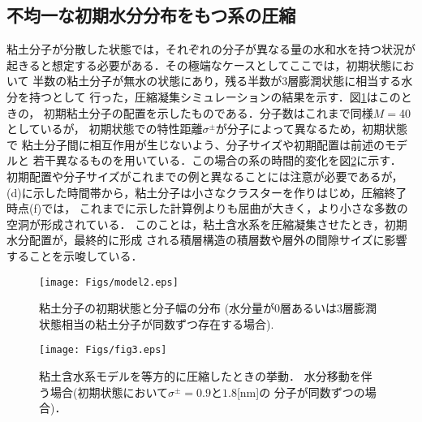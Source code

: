 ﻿\documentclass[11pt,a4j]{jarticle}
\begin{document}
\subsection{不均一な初期水分分布をもつ系の圧縮}
粘土分子が分散した状態では，それぞれの分子が異なる量の水和水を持つ状況が
起きると想定する必要がある．その極端なケースとしてここでは，初期状態において
半数の粘土分子が無水の状態にあり，残る半数が3層膨潤状態に相当する水分を持つとして
行った，圧縮凝集シミュレーションの結果を示す．図\ref{fig:fig8}はこのときの，
初期粘土分子の配置を示したものである．分子数はこれまで同様$M=$40としているが，
初期状態での特性距離$\sigma^\pm$が分子によって異なるため，初期状態で
粘土分子間に相互作用が生じないよう、分子サイズや初期配置は前述のモデルと
若干異なるものを用いている．この場合の系の時間的変化を図\ref{fig:fig4}に示す．
初期配置や分子サイズがこれまでの例と異なることには注意が必要であるが，
(d)に示した時間帯から，粘土分子は小さなクラスターを作りはじめ，圧縮終了時点(f)では，
これまでに示した計算例よりも屈曲が大きく，より小さな多数の空洞が形成されている．
このことは，粘土含水系を圧縮凝集させたとき，初期水分配置が，最終的に形成
される積層構造の積層数や層外の間隙サイズに影響することを示唆している．
\begin{figure}[h]
	\begin{center}
	\texttt{[image: Figs/model2.eps]}
	\end{center}
	\caption{
		粘土分子の初期状態と分子幅の分布
		(水分量が0層あるいは3層膨潤状態相当の粘土分子が同数ずつ存在する場合).
	}
	\label{fig:fig8}
\end{figure}
\begin{figure}[h]
	\begin{center}
	\texttt{[image: Figs/fig3.eps]} 
	\end{center}
	\caption{
		粘土含水系モデルを等方的に圧縮したときの挙動．
		水分移動を伴う場合(初期状態において$\sigma^\pm=0.9$と$1.8$[nm]の
		分子が同数ずつの場合)．
	} 
	\label{fig:fig4}
\end{figure}
\end{document}
